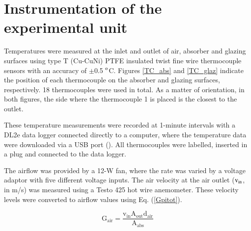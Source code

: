 
\section{Instrumentation of the experimental unit}

Temperatures were measured at the inlet and outlet of air, absorber and glazing surfaces using type T (Cu-CuNi) PTFE insulated twist fine wire thermocouple sensors with an accuracy of $\pm$0.5 $^{\rm{o}}$C. Figures \ref{TC_abs} and \ref{TC_glaz} indicate the position of each thermocouple on the absorber and glazing surfaces, respectively. 18 thermocouples were used in total. As a matter of orientation, in both figures, the side where the thermocouple 1 is placed is the closest to the outlet.



These temperature measurements were recorded at 1-minute intervals with a DL2e data logger connected directly to a computer, where the temperature data were downloaded via a USB port (\cite{Devices2018}). All thermocouples were labelled, inserted in a plug and connected to the data logger.

\newpage
The airflow was provided by a 12-W fan, where the rate was varied by a voltage adaptor with five different voltage inputs. The air velocity at the air outlet ($\rm{v_{in}}$, in m/s) was measured using a Testo 425 hot wire anemometer. These velocity levels were converted to airflow values using Eq. (\ref{Gpitot}).


\vspace{-0.75cm}
\begin{equation}
\mathrm{{G_{air}} = \frac{{{v_{in}}{A_{out}}{d_{air}}}}{{{A_{abs}}}}}
\label{Gpitot}
\end{equation}


